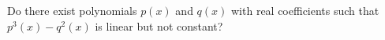 Do there exist polynomials $p(x)$ and $q(x)$ with real coefficients such that $p^3(x)-q^2(x)$ is linear but not constant?